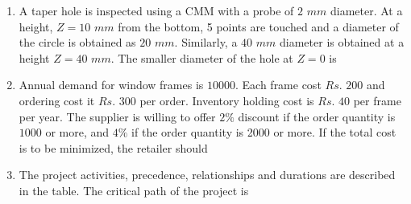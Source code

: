 \documentclass[journal,12pt,onecolumn]{IEEEtran}
\theoremstyle{remark}
\begin{document}
\begin{enumerate}
\item A taper hole is inspected using a CMM with a probe of $2$ $mm$ diameter. At a height, $Z=10$ $mm$ from the bottom, 5 points are touched and a diameter of the circle  is obtained as $20$ $mm$. Similarly, a $40$ $mm$ diameter is obtained at a height $Z=40$ $mm$. The smaller diameter  of the hole at $Z=0$ is
\\\begin{center}
   \scalebox{0.5}{}
\end{center}
\hfill{}
\begin{enumerate}
\end{enumerate}

\item Annual demand for window frames is $10000$. Each frame cost $Rs.$ $200$ and ordering cost it $Rs.$ $300$ per order. Inventory holding cost is $Rs.$ $40$ per frame per year. The supplier is willing to offer $2\%$ discount if the order quantity is $1000$ or more, and $4\%$ if the order quantity is 2000 or more. If the total cost is to be minimized, the retailer should

\hfill{}
\begin{enumerate}
\end{enumerate}

\item The project activities, precedence, relationships and durations are described in the table. The critical path of the project is\\
\\\begin{table}[h!]    
  \centering
  
\end{table}\\

\hfill{}
\begin{enumerate}
\end{enumerate}
\end{enumerate}
\end{document}
